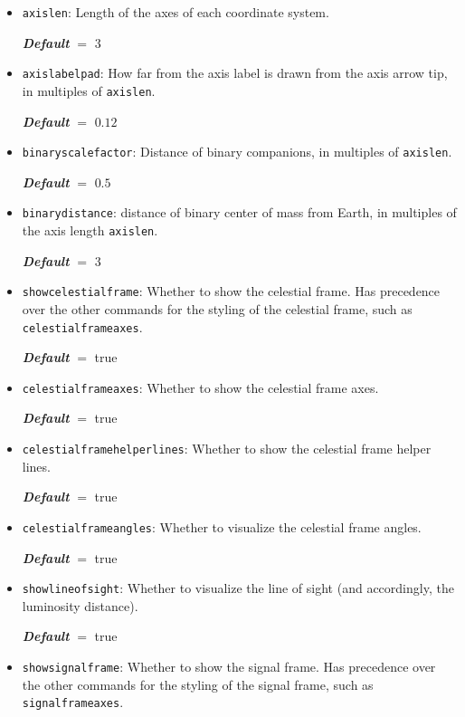 \documentclass[
    DIV=11,
    BCOR=0mm,
    paper=a4,
    fontsize=11pt,
    twoside=false,
    titlepage=true
]{scrartcl}
\newcommand{\code}[1]{\textcolor{codecolor}{\texttt{#1}}}
\newcommand{\defaultval}[1]{%
    {\bfseries\slshape%
    Default} $=$ #1%
}
\begin{document}
\begin{itemize}
    \item \code{axislen}: Length of the axes of each coordinate system.

    \defaultval{$3$}


    \item \code{axislabelpad}: How far from the axis label is drawn from the axis arrow tip, in multiples of \code{axislen}.

    \defaultval{$0.12$}


    \item \code{binaryscalefactor}: Distance of binary companions, in multiples of \code{axislen}.

    \defaultval{$0.5$}


    \item \code{binarydistance}: distance of binary center of mass from Earth, in multiples of the axis length \code{axislen}.

    \defaultval{$3$}




    \item \code{showcelestialframe}: Whether to show the celestial frame. Has precedence over the other commands for the styling of the celestial frame, such as \code{celestialframeaxes}.

    \defaultval{true}


    \item \code{celestialframeaxes}: Whether to show the celestial frame axes.

    \defaultval{true}


    \item \code{celestialframehelperlines}: Whether to show the celestial frame helper lines.

    \defaultval{true}


    \item \code{celestialframeangles}: Whether to visualize the celestial frame angles.

    \defaultval{true}


    \item \code{showlineofsight}: Whether to visualize the line of sight (and accordingly, the luminosity distance).

    \defaultval{true}


    \item \code{showsignalframe}: Whether to show the signal frame. Has precedence over the other commands for the styling of the signal frame, such as \code{signalframeaxes}.


\end{itemize}
\end{document}
